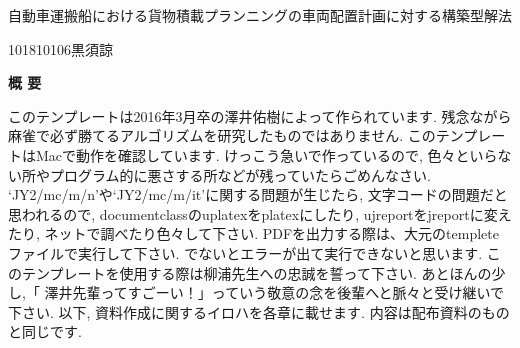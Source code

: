 \begin{center}
{\LARGE 自動車運搬船における貨物積載プランニングの車両配置計画に対する構築型解法}\\[0.5cm]
\end{center}
\hfill
{\large 101810106\qquad 黒須諒}\\[0.5cm]
\begin{center}
{\Large \bf 概 要}\\
\end{center}

このテンプレートは2016年3月卒の澤井佑樹によって作られています. 
残念ながら麻雀で必ず勝てるアルゴリズムを研究したものではありません. 
このテンプレートはMacで動作を確認しています. 
けっこう急いで作っているので, 色々といらない所やプログラム的に悪さする所などが残っていたらごめんなさい. 
`JY2/mc/m/n'や`JY2/mc/m/it'に関する問題が生じたら, 文字コードの問題だと思われるので, 
documentclassのuplatexをplatexにしたり, ujreportをjreportに変えたり, ネットで調べたり色々して下さい. 
PDFを出力する際は、大元のtempleteファイルで実行して下さい. 
でないとエラーが出て実行できないと思います. 
このテンプレートを使用する際は柳浦先生への忠誠を誓って下さい.
あとほんの少し,「 澤井先輩ってすごーい！」っていう敬意の念を後輩へと脈々と受け継いで下さい.
以下, 資料作成に関するイロハを各章に載せます. 
内容は配布資料のものと同じです. 
